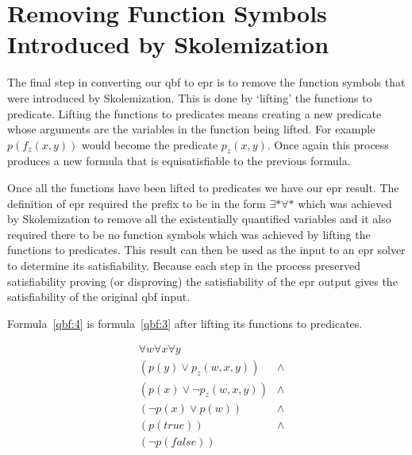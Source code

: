 \section{Removing Function Symbols Introduced by Skolemization}
The final step in converting our \gls{qbf} to \gls{epr} is to remove the function symbols that were introduced by Skolemization. This is done by `lifting' the functions to predicate. Lifting the functions to predicates means creating a new predicate whose arguments are the variables in the function being lifted. For example $p(f_z(x, y))$ would become the predicate $p_z(x, y)$. Once again this process produces a new formula that is equisatisfiable to the previous formula.

Once all the functions have been lifted to predicates we have our \gls{epr} result. The definition of \gls{epr} required the prefix to be in the form $\exists * \forall *$ which was achieved by Skolemization to remove all the existentially quantified variables and it also required there to be no function symbols which was achieved by lifting the functions to predicates. This result can then be used as the input to an \gls{epr} solver to determine its satisfiability. Because each step in the process preserved satisfiability proving (or disproving) the satisfiability of the \gls{epr} output gives the satisfiability of the original \gls{qbf} input.

Formula~\ref{qbf:4} is formula~\ref{qbf:3} after lifting its functions to predicates.

\begin{equation} \label{qbf:4}
\begin{aligned}
&\forall w \forall x \forall y\\
&(p(y) \lor p_z(w, x, y)) &\land\\
&(p(x) \lor \neg p_z(w, x, y)) &\land\\
&(\neg p(x) \lor p(w)) &\land\\
&(p(true)) &\land\\
&(\neg p(false))
\end{aligned}
\end{equation}

